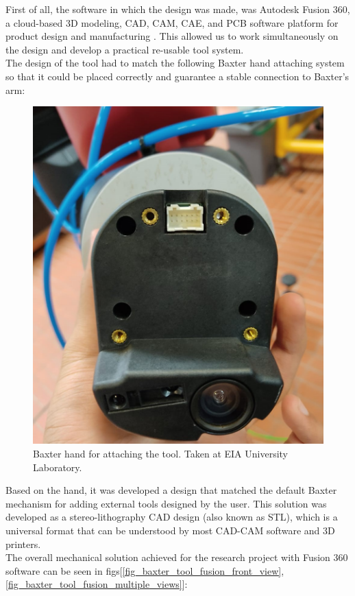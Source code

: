 \documentclass[11pt]{report} %
\begin{document}
First of all, the software in which the design was made, was Autodesk Fusion 360, a cloud-based 3D modeling, CAD, CAM, CAE, and PCB software platform for product design and manufacturing \citep{cite_autodesk_fusion}. This allowed us to work simultaneously on the design and develop a practical re-usable tool system.\\

The design of the tool had to match the following Baxter hand attaching system so that it could be placed correctly and guarantee a stable connection to Baxter's arm:

\begin{figure}[H]
    \centering
    \includegraphics[width=0.6\linewidth]{assets/imgs/baxter_robot/baxter_hand_before_tool.jpeg}
    \caption{Baxter hand for attaching the tool. Taken at EIA University Laboratory.} 
    \label{fig_baxter_hand_for_attaching_the_tool}
\end{figure}

Based on the hand, it was developed a design that matched the default Baxter mechanism for adding external tools designed by the user. This solution was developed as a stereo-lithography CAD design (also known as STL), which is a universal format that can be understood by most CAD-CAM software and 3D printers.\\

The overall mechanical solution achieved for the  research project with Fusion 360 software can be seen in figs[\ref{fig_baxter_tool_fusion_front_view}, \ref{fig_baxter_tool_fusion_multiple_views}]:
\end{document}
